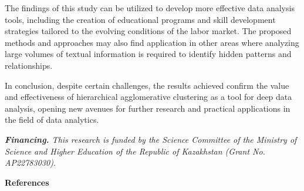 \begin{multicols}{2}
The findings of this study can be utilized to develop more effective
data analysis tools, including the creation of educational programs and
skill development strategies tailored to the evolving conditions of the
labor market. The proposed methods and approaches may also find
application in other areas where analyzing large volumes of textual
information is required to identify hidden patterns and relationships.

In conclusion, despite certain challenges, the results achieved confirm
the value and effectiveness of hierarchical agglomerative clustering as
a tool for deep data analysis, opening new avenues for further research
and practical applications in the field of data analytics.

\emph{{\bfseries Financing.} This research is funded by the Science
Committee of the Ministry of Science and Higher Education of the
Republic of Kazakhstan (Grant No. AP22783030).}
\end{multicols}

\begin{center}
{\bfseries References}
\end{center}

